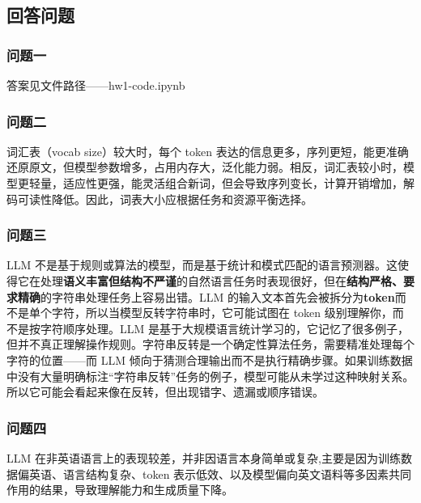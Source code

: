 \documentclass{article}
\begin{document}
\subsection{回答问题}
\subsubsection{问题一}
答案见文件路径——hw1-code\bpe\unicode.ipynb

\subsubsection{问题二}
词汇表（vocab size）较大时，每个 token 表达的信息更多，序列更短，能更准确还原原文，但模型参数增多，占用内存大，泛化能力弱。相反，词汇表较小时，模型更轻量，适应性更强，能灵活组合新词，但会导致序列变长，计算开销增加，解码可读性降低。因此，词表大小应根据任务和资源平衡选择。

\subsubsection{问题三}
LLM 不是基于规则或算法的模型，而是基于统计和模式匹配的语言预测器。这使得它在处理\textbf{语义丰富但结构不严谨}的自然语言任务时表现很好，但在\textbf{结构严格、要求精确}的字符串处理任务上容易出错。LLM 的输入文本首先会被拆分为\textbf{token}而不是单个字符，所以当模型反转字符串时，它可能试图在 token 级别理解你，而不是按字符顺序处理。LLM 是基于大规模语言统计学习的，它记忆了很多例子，但并不真正理解操作规则。字符串反转是一个确定性算法任务，需要精准处理每个字符的位置——而 LLM 倾向于猜测合理输出而不是执行精确步骤。如果训练数据中没有大量明确标注“字符串反转”任务的例子，模型可能从未学过这种映射关系。所以它可能会看起来像在反转，但出现错字、遗漏或顺序错误。

\subsubsection{问题四}
LLM 在非英语语言上的表现较差，并非因语言本身简单或复杂,主要是因为训练数据偏英语、语言结构复杂、token 表示低效、以及模型偏向英文语料等多因素共同作用的结果，导致理解能力和生成质量下降。
\end{document}
